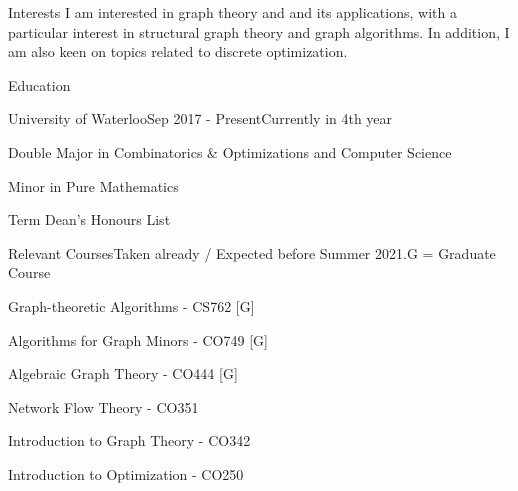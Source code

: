 \documentclass{cv}
\begin{document}
\begin{rSection}{Interests}
	I am interested in graph theory and and its applications, with a particular interest in structural graph theory and graph algorithms. In addition, I am also keen on topics related to discrete optimization.
\end{rSection}

\begin{rSection}{Education}
\begin{rSubsection}{University of Waterloo}{Sep 2017 - Present}{Currently in 4th year}{}
	\item Double Major in Combinatorics \& Optimizations and Computer Science
	\item Minor in Pure Mathematics
	\item Term Dean's Honours List
\end{rSubsection}


\begin{rSubsection}{Relevant Courses}{}{Taken already / Expected before Summer 2021.}{G = Graduate Course}
	\item Graph-theoretic Algorithms - CS762 [G]
	\item Algorithms for Graph Minors - CO749 [G]
	\item Algebraic Graph Theory - CO444 [G]
	\item Network Flow Theory - CO351
	\item Introduction to Graph Theory - CO342
	\item Introduction to Optimization - CO250
\end{rSubsection}



\end{rSection}
\end{document}
